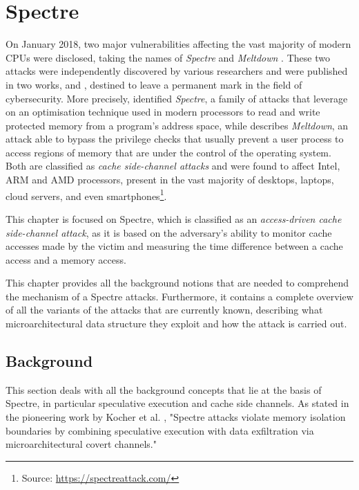 \documentclass[12pt,a4paper]{book}
\theoremstyle{definition}
\begin{document}
	\chapter{Spectre}\label{chapter:spectre}
	On January 2018, two major vulnerabilities affecting the vast majority of modern CPUs were disclosed, taking the names of \textit{Spectre} \cite{Kocher2019} and \textit{Meltdown} \cite{Lipp2018}. These two attacks were independently discovered by various researchers and were published in 
	two works, \cite{Kocher2019} and \cite{Lipp2018}, destined to leave a permanent mark in the field of cybersecurity. More precisely, \cite{Kocher2019} identified \textit{Spectre}, a family of attacks that leverage on an optimisation technique used in modern processors to read and write protected memory from a program's address space, while \cite{Lipp2018} describes \textit{Meltdown}, an attack able to bypass the privilege checks that usually prevent a user process to access regions of memory that are under the control of the operating system. Both are classified as \textit{cache side-channel attacks} and were found to affect Intel, ARM and AMD processors, present in the vast majority of desktops, laptops, cloud servers, and even smartphones\footnote{Source: \url{https://spectreattack.com/}}.
	
	This chapter is focused on Spectre, which is classified as an \textit{access-driven cache side-channel attack}, as it is based on the adversary's ability to monitor cache accesses made by the victim and measuring the time difference between a cache access and a memory access.
	
	This chapter provides all the background notions that are needed to comprehend the mechanism of a Spectre attacks. Furthermore, it contains a complete overview of all the variants of the attacks that are currently known, describing what microarchitectural data structure they exploit and how the attack is carried out.
	\section{Background}
	This section deals with all the background concepts that lie at the basis of Spectre, in particular speculative execution and cache side channels. As stated in the pioneering work by Kocher et al. \cite{Kocher2019}, "Spectre attacks violate memory isolation boundaries by combining speculative execution with data exfiltration via microarchitectural covert channels."
\end{document}
